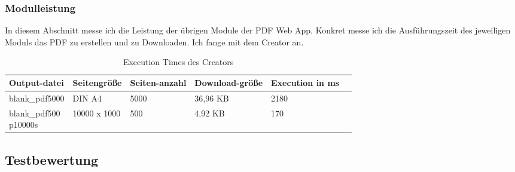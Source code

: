 \subsubsection{Modulleistung}
In diesem Abschnitt messe ich die Leistung der übrigen Module der PDF Web App. Konkret messe ich die Ausführungszeit des jeweiligen Moduls das PDF zu erstellen und zu Downloaden. Ich fange mit dem Creator an.

\begin{table}[!htbp]
	\centering
	\begin{tabular}{|p{3cm}|p{2cm}|p{2cm}|p{2cm}|p{2cm}|p{2cm}|}
		\hline
		\textbf{Output-datei}					& \textbf{Seitengröße}	& \textbf{Seiten-anzahl}	& \textbf{Download-größe}	& \textbf{Execution in ms} 	\\ 
		\hline
		blank\_pdf5000							& DIN A4 				& 5000 						& 36,96 KB 					& 2180  					\\
		\parbox[t]{4cm}{blank\_pdf500\\p10000s}	& 10000 x 1000			& 500 						& 4,92 KB					& 170 						\\
		\hline
	\end{tabular}
	\caption{Execution Times des Creators}
	\label{table:creator-dur}
\end{table}

\subsection{Testbewertung}